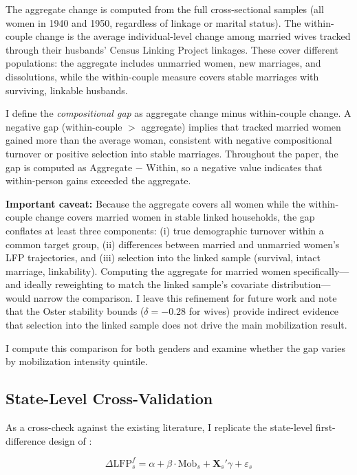 \documentclass[12pt]{article}
\begin{document}
\noindent The aggregate change is computed from the full cross-sectional samples (all women in 1940 and 1950, regardless of linkage or marital status). The within-couple change is the average individual-level change among married wives tracked through their husbands' Census Linking Project linkages. These cover different populations: the aggregate includes unmarried women, new marriages, and dissolutions, while the within-couple measure covers stable marriages with surviving, linkable husbands.

I define the \textit{compositional gap} as aggregate change minus within-couple change. A negative gap (within-couple $>$ aggregate) implies that tracked married women gained more than the average woman, consistent with negative compositional turnover or positive selection into stable marriages. Throughout the paper, the gap is computed as Aggregate $-$ Within, so a negative value indicates that within-person gains exceeded the aggregate.

\textbf{Important caveat:} Because the aggregate covers all women while the within-couple change covers married women in stable linked households, the gap conflates at least three components: (i) true demographic turnover within a common target group, (ii) differences between married and unmarried women's LFP trajectories, and (iii) selection into the linked sample (survival, intact marriage, linkability). Computing the aggregate for married women specifically---and ideally reweighting to match the linked sample's covariate distribution---would narrow the comparison. I leave this refinement for future work and note that the Oster stability bounds ($\delta = -0.28$ for wives) provide indirect evidence that selection into the linked sample does not drive the main mobilization result.

I compute this comparison for both genders and examine whether the gap varies by mobilization intensity quintile.

\subsection{State-Level Cross-Validation}

As a cross-check against the existing literature, I replicate the state-level first-difference design of \citet{acemoglu2004women}:

\begin{equation}
\Delta \text{LFP}^f_s = \alpha + \beta \cdot \text{Mob}_s + \mathbf{X}_s' \gamma + \varepsilon_s
\label{eq:state_fd}
\end{equation}
\end{document}
